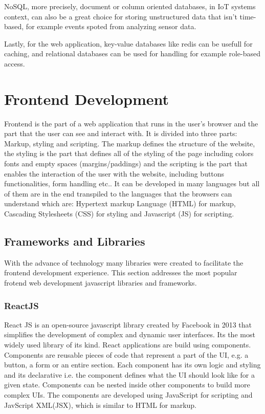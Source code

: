 NoSQL, more precisely, document or column oriented databases, in IoT systems
context, can also be a great choice for storing unstructured data that isn't
time-based, for example events spoted from analyzing sensor data.

Lastly, for the web application, key-value databases like redis can be usefull
for caching, and relational databases can be used for handling for example
role-based access.

\section{Frontend Development}
Frontend is the part of a web application that runs in the user's browser and
the part that the user can see and interact with. It is divided into three
parts: Markup, styling and scripting.
The markup defines the structure of the website, the styling is the part that
defines all of the styling of the page including colors fonts and empty spaces
(margins/paddings) and the scripting is the part that enables the interaction
of the user with the website, including buttons functionalities, form handling
etc..
It can be developed in many languages but all of them are in the end transpiled
to the languages that the browsers can understand which are: Hypertext markup
Language (HTML) for markup, Cascading Stylesheets (CSS) for styling and
Javascript (JS) for scripting.

\subsection{Frameworks and Libraries}
With the advance of technology many libraries were created to facilitate the
frontend development experience. This section addresses the most popular
frotend web development javascript libraries and frameworks.
\subsubsection{ReactJS}
React JS is an open-source javascript library created by Facebook in 2013 that
simplifies the development of complex and dynamic user interfaces. Its the most widely
used library of its kind.
React applications are build using components. Components are reusable pieces of
code that represent a part of the UI, e.g. a button, a form or an entire section.
Each component has its own logic and styling and its declarative i.e. the
component defines what the UI should look like for a given state.
Components can be nested inside other components to build more complex UIs.
The components are developed using JavaScript for scripting and JavScript XML(JSX),
which is similar to HTML for markup.

